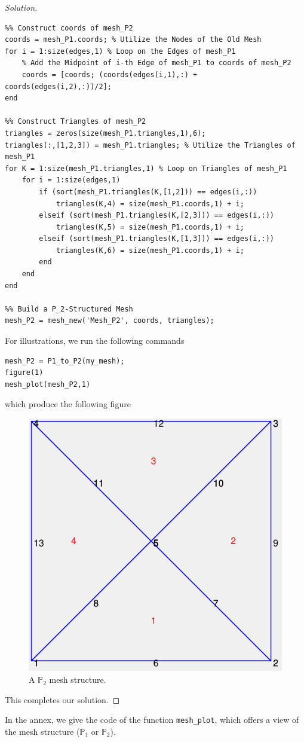 \documentclass[11pt,a4paper,center,notitlepage]{article}
\numberwithin{equation}{section}
\begin{document}
\begin{proof}[Solution]
\begin{verbatim}
%% Construct coords of mesh_P2
coords = mesh_P1.coords; % Utilize the Nodes of the Old Mesh
for i = 1:size(edges,1) % Loop on the Edges of mesh_P1
    % Add the Midpoint of i-th Edge of mesh_P1 to coords of mesh_P2
    coords = [coords; (coords(edges(i,1),:) + coords(edges(i,2),:))/2];
end

%% Construct Triangles of mesh_P2
triangles = zeros(size(mesh_P1.triangles,1),6);
triangles(:,[1,2,3]) = mesh_P1.triangles; % Utilize the Triangles of mesh_P1
for K = 1:size(mesh_P1.triangles,1) % Loop on Triangles of mesh_P1
    for i = 1:size(edges,1)
        if (sort(mesh_P1.triangles(K,[1,2])) == edges(i,:))
            triangles(K,4) = size(mesh_P1.coords,1) + i;
        elseif (sort(mesh_P1.triangles(K,[2,3])) == edges(i,:))
            triangles(K,5) = size(mesh_P1.coords,1) + i;
        elseif (sort(mesh_P1.triangles(K,[1,3])) == edges(i,:))
            triangles(K,6) = size(mesh_P1.coords,1) + i;
        end
    end
end

%% Build a P_2-Structured Mesh
mesh_P2 = mesh_new('Mesh_P2', coords, triangles);
\end{verbatim}
For illustrations, we run the following commands
\begin{verbatim}
mesh_P2 = P1_to_P2(my_mesh);
figure(1)
mesh_plot(mesh_P2,1)
\end{verbatim}
which produce the following figure
\begin{figure}[H]
\centering
\includegraphics[scale=0.6]{Mesh_P2}
\caption{A $\mathbb{P}_2$ mesh structure.}
\end{figure}
This completes our solution.
\end{proof}
In the annex, we give the code of the function \verb|mesh_plot|, which offers a view of the mesh structure ($\mathbb{P}_1$ or $\mathbb{P}_2$).
\end{document}
